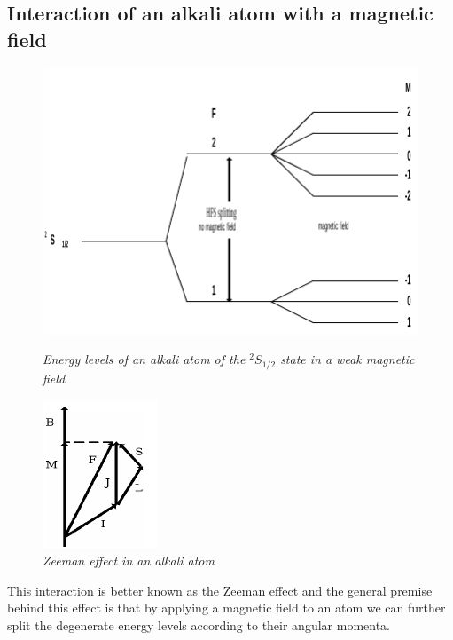 \documentclass[twocolumn]{article}
\begin{document}
\subsection{Interaction of an alkali atom with a magnetic field}
\begin{figure}
\begin{minipage}{0.45\linewidth}
\includegraphics[width=\linewidth]{pictures/zeeman-splitting.png}
\caption{\textit{Energy levels of an alkali atom of the $^2S_{1/2}$ state in a 
weak magnetic field \cite{ref:3}}}
\label{fig:5}
\end{minipage}
\hfill
\begin{minipage}{0.45\linewidth}
\includegraphics[width=0.3\linewidth]{pictures/zeeman-vectors.png}
\caption{\textit{Zeeman effect in an alkali atom \cite{ref:3}}}
\label{fig:6}
\end{minipage}
\end{figure}
This interaction is better known as the Zeeman effect and the general premise 
behind this effect is that by applying a magnetic field to an atom we can 
further split the degenerate energy levels according to their angular momenta.
\\
\end{document}
